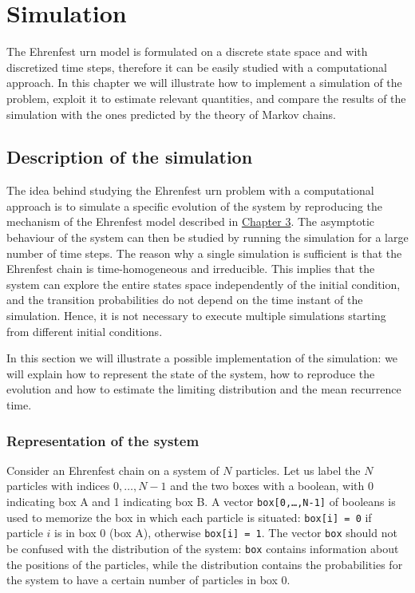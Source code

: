 \chapter{Simulation}
The Ehrenfest urn model is formulated on a discrete state space and with discretized time steps, therefore it can be easily studied with a computational approach. In this chapter we will illustrate how to implement a simulation of the problem, exploit it to estimate relevant quantities, and compare the results of the simulation with the ones predicted by the theory of Markov chains.

\section{Description of the simulation}
The idea behind studying the Ehrenfest urn problem with a computational approach is to simulate a specific evolution of the system by reproducing the mechanism of the Ehrenfest model described in \hyperref[ch:3]{Chapter 3}. The asymptotic behaviour of the system can then be studied by running the simulation for a large number of time steps. The reason why a single simulation is sufficient is that the Ehrenfest chain is time-homogeneous and irreducible. This implies that the system can explore the entire states space independently of the initial condition, and the transition probabilities do not depend on the time instant of the simulation. Hence, it is not necessary to execute multiple simulations starting from different initial conditions.

In this section we will illustrate a possible implementation of the simulation: we will explain how to represent the state of the system, how to reproduce the evolution and how to estimate the limiting distribution and the mean recurrence time.

\subsection{Representation of the system}
Consider an Ehrenfest chain on a system of $N$ particles. Let us label the $N$ particles with indices $0, \dots,N-1$ and the two boxes with a boolean, with 0 indicating box A and 1 indicating box B. A vector \texttt{box[0,\dots,N-1]} of booleans is used to memorize the box in which each particle is situated: \texttt{box[i] = 0} if particle $i$ is in box 0 (\ie box A), otherwise \texttt{box[i] = 1}. The vector \texttt{box} should not be confused with the distribution of the system: \texttt{box} contains information about the positions of the particles, while the distribution contains the probabilities for the system to have a certain number of particles in box 0.

